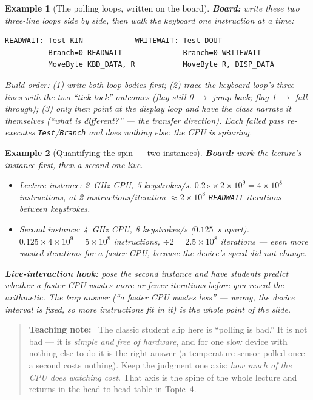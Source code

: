 \documentclass[11pt]{article}
\newtheorem{example}{Example}[section]
\newenvironment{teachingaside}{\begin{quote}\small\color{primary-gold}\textbf{Teaching note:}\ }{\end{quote}}
\begin{document}
\begin{example}[The polling loops, written on the board]
\label{ex:pollloops}
\textbf{Board:} write these two three-line loops side by side, then walk the keyboard one instruction at a time:
\begin{verbatim}
READWAIT: Test KIN            WRITEWAIT: Test DOUT
          Branch=0 READWAIT              Branch=0 WRITEWAIT
          MoveByte KBD_DATA, R           MoveByte R, DISP_DATA
\end{verbatim}
Build order: (1) write both loop bodies first; (2) trace the keyboard loop's three lines with the two ``tick-tock'' outcomes (flag still 0 $\to$ jump back; flag 1 $\to$ fall through); (3) only then point at the display loop and have the class narrate it themselves (``what is different?'' --- the transfer direction). Each failed pass re-executes \texttt{Test}/\texttt{Branch} and does nothing else: the CPU is \emph{spinning}.
\end{example}

\begin{example}[Quantifying the spin --- two instances]
\label{ex:polllwaste}
\textbf{Board:} work the lecture's instance first, then a second one live.
\begin{itemize}
  \item \emph{Lecture instance:} 2~GHz CPU, 5 keystrokes/s. $0.2~\text{s}\times 2\times10^9=4\times10^8$ instructions, at 2 instructions/iteration $\approx 2\times10^8$ \texttt{READWAIT} iterations between keystrokes.
  \item \emph{Second instance:} 4~GHz CPU, 8 keystrokes/s ($0.125$~s apart). $0.125\times 4\times10^9=5\times10^8$ instructions, $\div 2 = 2.5\times10^8$ iterations --- even \emph{more} wasted iterations for a faster CPU, because the device's speed did not change.
\end{itemize}
\textbf{Live-interaction hook:} pose the second instance and have students \emph{predict} whether a faster CPU wastes more or fewer iterations before you reveal the arithmetic. The trap answer (``a faster CPU wastes \emph{less}'' --- wrong, the device interval is fixed, so more instructions fit in it) is the whole point of the slide.
\end{example}

\begin{teachingaside}
The classic student slip here is ``polling is bad.'' It is not bad --- it is \emph{simple and free of hardware}, and for one slow device with nothing else to do it is the right answer (a temperature sensor polled once a second costs nothing). Keep the judgment one axis: \emph{how much of the CPU does watching cost}. That axis is the spine of the whole lecture and returns in the head-to-head table in Topic~4.
\end{teachingaside}
\end{document}
